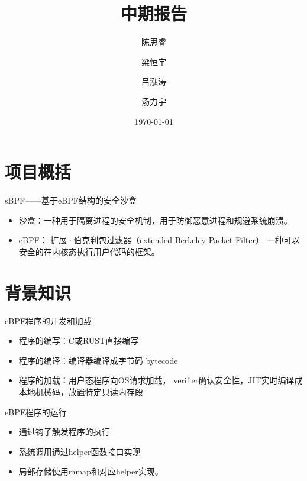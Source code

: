 \documentclass[UTF8,fontset=macnew,xcolor=table]{ctexbeamer}
\begin{document}
\title[中期报告]{\huge 中期报告}
\author[中国科学技术大学]{陈思睿 \and 梁恒宇 \and 吕泓涛 \and 汤力宇}
\date[\today]{\today}
\begin{frame}
    \titlepage
\end{frame}

\section{项目概括}
\begin{frame}{sBPF——基于eBPF结构的安全沙盒}

    \begin{itemize}
        \item 沙盒：一种用于隔离进程的安全机制，用于防御恶意进程和规避系统崩溃。

        \item eBPF： 扩展·伯克利包过滤器（extended Berkeley Packet Filter）
        一种可以安全的在内核态执行用户代码的框架。
        
    \end{itemize}
    
\end{frame}

\section{背景知识}

\begin{frame}{eBPF程序的开发和加载}

    \begin{itemize}
        \item 程序的编写：C或RUST直接编写

        \item 程序的编译：编译器编译成字节码 bytecode
        
        \item 程序的加载：用户态程序向OS请求加载，
        verifier确认安全性，JIT实时编译成本地机械码，放置特定只读内存段
    \end{itemize}
    
\end{frame}

\begin{frame}{eBPF程序的运行}

    \begin{itemize}
        \item 通过钩子触发程序的执行

        \item 系统调用通过helper函数接口实现
        
        \item 局部存储使用mmap和对应helper实现。
    \end{itemize}
    
\end{frame}
\end{document}
